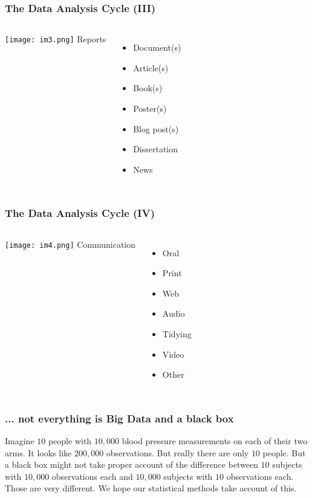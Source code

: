 \documentclass{beamer}
\begin{document}
\begin{frame}
\frametitle{The Data Analysis Cycle (III)}
\begin{columns}
    \hspace*{1cm}
    \texttt{[image: im3.png]}
    Reports  
    \begin{itemize}
    \item[] Document(s)
    \item[] Article(s)
    \item[] Book(s)
    \item[] Poster(s)
    \item[] Blog post(s)
    \item[] Dissertation
    \item[] News
    \end{itemize}
\end{columns}
\end{frame}
\begin{frame}
\frametitle{The Data Analysis Cycle (IV)}
\begin{columns}
    \hspace*{1cm}
    \texttt{[image: im4.png]}
    Communication  
    \begin{itemize}
    \item[] Oral
    \item[] Print
    \item[] Web
    \item[] Audio
    \item[] Tidying
    \item[] Video
    \item[] Other
    \end{itemize}
\end{columns}
\end{frame}
\begin{frame}
\frametitle{... not everything is Big Data and a black box}
Imagine $10$ people with $10,000$ blood pressure measurements on each of their two arms. It looks like $200,000$ observations.  But really there are only $10$ people. But a black box might not take proper account of the difference between $10$ subjects with $10,000$ observations each and $10,000$ subjects with $10$ observations each. Those are very different. We hope our statistical methods take account of this. 

\end{frame}
\end{document}
